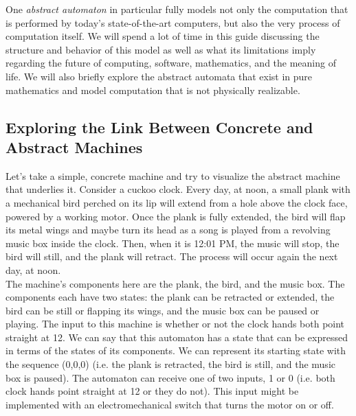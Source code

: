 One \textit{abstract automaton} in particular fully models not only the computation that is performed by today's state-of-the-art computers, but also the very process of computation itself. We will spend a lot of time in this guide discussing the structure and behavior of this model as well as what its limitations imply regarding the future of computing, software, mathematics, and the meaning of life. We will also briefly explore the abstract automata that exist in pure mathematics and model computation that is not physically realizable. \\



\subsection{Exploring the Link Between Concrete and Abstract Machines}

Let's take a simple, concrete machine and try to visualize the abstract machine that underlies it. Consider a cuckoo clock. Every day, at noon, a small plank with a mechanical bird perched on its lip will extend from a hole above the clock face, powered by a working motor. Once the plank is fully extended, the bird will flap its metal wings and maybe turn its head as a song is played from a revolving music box inside the clock. Then, when it is 12:01 PM, the music will stop, the bird will still, and the plank will retract. The process will occur again the next day, at noon. \\

The machine's components here are the plank, the bird, and the music box. The components each have two states: the plank can be retracted or extended, the bird can be still or flapping its wings, and the music box can be paused or playing. The input to this machine is whether or not the clock hands both point straight at 12. We can say that this automaton has a state that can be expressed in terms of the states of its components. We can represent its starting state with the sequence (0,0,0) (i.e. the plank is retracted, the bird is still, and the music box is paused). The automaton can receive one of two inputs, 1 or 0 (i.e. both clock hands point straight at 12 or they do not). This input might be implemented with an electromechanical switch that turns the motor on or off.

